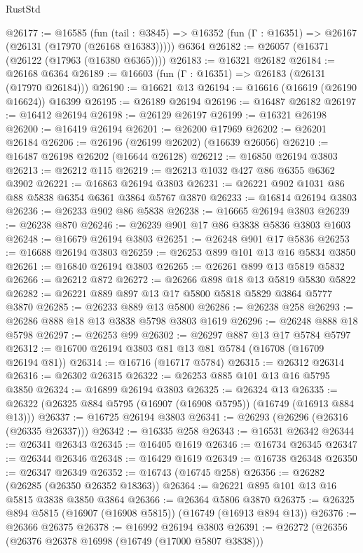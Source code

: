 \begin{lexlean}{RustStd}
\begin{coremodule}
@26177 := @16585
    (fun (tail : @3845) => @16352 (fun (Γ : @16351) => @26167 (@26131 (@17970 (@26168 @16383)))))
    @6364
@26182 := @26057 (@16371 (@26122 (@17963 (@16380 @6365))))
@26183 := @16321 @26182
@26184 := @26168 @6364
@26189 := @16603 (fun (Γ : @16351) => @26183 (@26131 (@17970 @26184)))
@26190 := @16621 @13
@26194 := @16616 (@16619 (@26190 @16624)) @16399
@26195 := @26189 @26194
@26196 := @16487 @26182
@26197 := @16412 @26194
@26198 := @26129 @26197
@26199 := @16321 @26198
@26200 := @16419 @26194
@26201 := @26200 @17969
@26202 := @26201 @26184
@26206 := @26196 (@26199 @26202) (@16639 @26056)
@26210 := @16487 @26198 @26202 (@16644 @26128)
@26212 := @16850 @26194 @3803
@26213 := @26212 @115
@26219 := @26213 @1032 @427 @86 @6355 @6362 @3902
@26221 := @16863 @26194 @3803
@26231 := @26221 @902 @1031 @86 @88 @5838 @6354 @6361 @3864 @5767 @3870
@26233 := @16814 @26194 @3803
@26236 := @26233 @902 @86 @5838
@26238 := @16665 @26194 @3803
@26239 := @26238 @870
@26246 := @26239 @901 @17 @86 @3838 @5836 @3803 @1603
@26248 := @16679 @26194 @3803
@26251 := @26248 @901 @17 @5836
@26253 := @16688 @26194 @3803
@26259 := @26253 @899 @101 @13 @16 @5834 @3850
@26261 := @16840 @26194 @3803
@26265 := @26261 @899 @13 @5819 @5832
@26266 := @26212 @872
@26272 := @26266 @898 @18 @13 @5819 @5830 @5822
@26282 := @26221 @889 @897 @13 @17 @5800 @5818 @5829 @3864 @5777 @3870
@26285 := @26233 @889 @13 @5800
@26286 := @26238 @258
@26293 := @26286 @888 @18 @13 @3838 @5798 @3803 @1619
@26296 := @26248 @888 @18 @5798
@26297 := @26253 @99
@26302 := @26297 @887 @13 @17 @5784 @5797
@26312 := @16700 @26194 @3803 @81 @13 @81 @5784 (@16708 (@16709 @26194 @81))
@26314 := @16716 (@16717 @5784)
@26315 := @26312 @26314
@26316 := @26302 @26315
@26322 := @26253 @885 @101 @13 @16 @5795 @3850
@26324 := @16899 @26194 @3803
@26325 := @26324 @13
@26335 := @26322 (@26325 @884 @5795 (@16907 (@16908 @5795)) (@16749 (@16913 @884 @13)))
@26337 := @16725 @26194 @3803
@26341 := @26293 (@26296 (@26316 (@26335 @26337)))
@26342 := @16335 @258
@26343 := @16531 @26342
@26344 := @26341 @26343
@26345 := @16405 @1619
@26346 := @16734 @26345
@26347 := @26344 @26346
@26348 := @16429 @1619
@26349 := @16738 @26348
@26350 := @26347 @26349
@26352 := @16743 (@16745 @258)
@26356 := @26282 (@26285 (@26350 @26352 @18363))
@26364 := @26221 @895 @101 @13 @16 @5815 @3838 @3850 @3864
@26366 := @26364 @5806 @3870
@26375 := @26325 @894 @5815 (@16907 (@16908 @5815)) (@16749 (@16913 @894 @13))
@26376 := @26366 @26375
@26378 := @16992 @26194 @3803
@26391 := @26272
    (@26356
      (@26376 @26378 @16998 (@16749 (@17000 @5807 @3838)))

\end{coremodule}
\end{lexlean}
